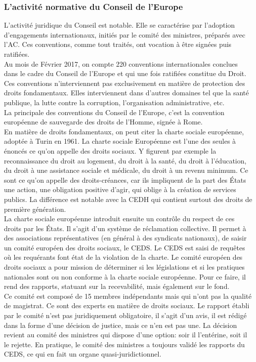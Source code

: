 \documentclass[10pt, a4paper, openany]{book}
\begin{document}
\subsubsection{L'activité normative du Conseil de l'Europe}

L'activité juridique du Conseil est notable. Elle se caractérise par l'adoption d'engagements internationaux, initiés par le comité des ministres, préparés avec l'AC. Ces conventions, comme tout traités, ont vocation à être signées puis ratifiées. \\
Au mois de Février 2017, on compte 220 conventions internationales conclues dans le cadre du Conseil de l'Europe et qui une fois ratifiées constitue du Droit. Ces conventions n'interviennent pas exclusivement en matière de protection des droits fondamentaux. Elles interviennent dans d'autres domaines tel que la santé publique, la lutte contre la corruption, l'organisation administrative, etc. \\
La principale des conventions du Conseil de l'Europe, c'est la convention européenne de sauvegarde des droits de l'Homme, signée à Rome. \\
En matière de droits fondamentaux, on peut citer la charte sociale européenne, adoptée à Turin en 1961. La charte sociale Européenne est l'une des seules à énoncés ce qu'on appelle des droits sociaux. Y figurent par exemple la reconnaissance du droit au logement, du droit à la santé, du droit à l'éducation, du droit à une assistance sociale et médicale, du droit à un revenu minimum. Ce sont ce qu'on appelle des droits-créances, car ils impliquent de la part des États une action, une obligation positive d'agir, qui oblige à la création de services publics. La différence est notable avec la CEDH qui contient surtout des droits de première génération. \\
La charte sociale européenne introduit ensuite un contrôle du respect de ces droits par les États. Il s'agit d'un système de réclamation collective. Il permet à des associations représentatives (en général à des syndicats nationaux), de saisir un comité européen des droits sociaux, le CEDS. Le CEDS est saisi de requêtes où les requérants font état de la violation de la charte. Le comité européen des droits sociaux a pour mission de déterminer si les législations et si les pratiques nationales sont ou non conforme à la charte sociale européenne. Pour ce faire, il rend des rapports, statuant sur la recevabilité, mais également sur le fond. \\
Ce comité est composé de 15 membres indépendants mais qui n'ont pas la qualité de magistrat. Ce sont des experts en matière de droits sociaux. Le rapport établi par le comité n'est pas juridiquement obligatoire, il s'agit d'un avis, il est rédigé dans la forme d'une décision de justice, mais ce n'en est pas une. La décision revient au comité des ministres qui dispose d'une option: soir il l'entérine, soit il le rejette. En pratique, le comité des ministres a toujours validé les rapports du CEDS, ce qui en fait un organe quasi-juridictionnel. 
\end{document}
